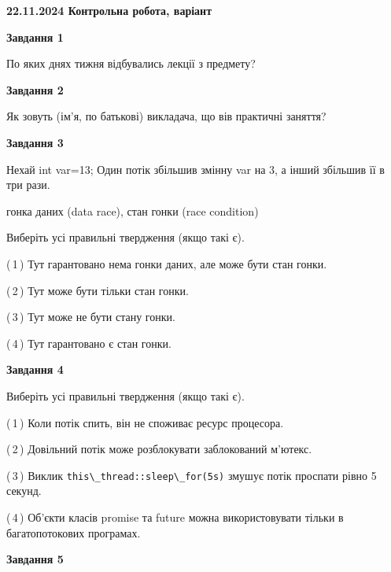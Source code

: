 \documentclass[12pt, ukrainian]{article}
\def\code#1{\Verb!#1!}
\begin{document}
\begin {large}

\textbf{22.11.2024 Контрольна робота, варіант  }\par


{

\begin{center}
\textbf{Завдання 1}
\end{center}

По яких днях тижня відбувались лекції з предмету?


\begin{center}
\textbf{Завдання 2}
\end{center}

Як зовуть (ім'я, по батькові) викладача, що вів практичні заняття?


\begin{center}
\textbf{Завдання 3}
\end{center}

Нехай int var=13; Один потік збільшив змінну var на 3, а інший збільшив її в три рази.

гонка даних (data race), стан гонки (race condition)

Виберіть усі правильні твердження (якщо такі є).\par
\vspace{2mm}
(\,1\,) Тут гарантовано нема гонки даних, але може бути стан гонки.%

(\,2\,) Тут може бути тільки стан гонки.%

(\,3\,) Тут може не бути стану гонки.%

(\,4\,) Тут гарантовано є стан гонки.%


\begin{center}
\textbf{Завдання 4}
\end{center}

Виберіть усі правильні твердження (якщо такі є).\par
\vspace{2mm}

(\,1\,) Коли потік спить, він не споживає ресурс процесора.%

(\,2\,) Довільний потік може розблокувати заблокований м’ютекс.%

(\,3\,) Виклик \code{this\_thread::sleep\_for(5s)} змушує потік проспати рівно 5 секунд.%

(\,4\,) Об’єкти класів promise та future можна використовувати тільки в багатопотокових програмах.%


\begin{center}
\textbf{Завдання 5}
\end{center}

}
\end{large}
\end{document}
